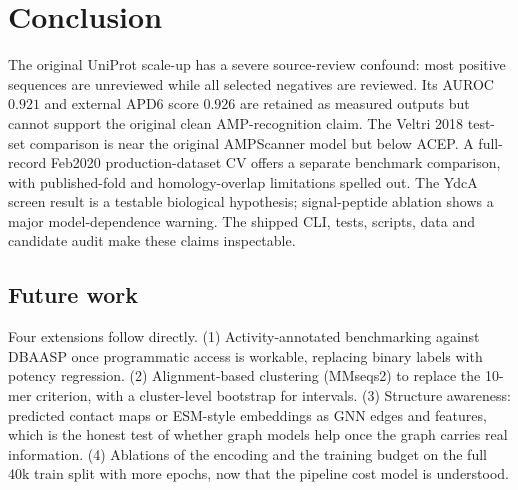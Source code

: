 \section{Conclusion}
The original UniProt scale-up has a severe source-review confound: most
positive sequences are unreviewed while all selected negatives are reviewed.
Its AUROC $0.921$ and external APD6 score $0.926$ are retained as measured
outputs but cannot support the original clean AMP-recognition claim. The
Veltri 2018 test-set comparison is near the original AMPScanner model but
below ACEP. A full-record Feb2020 production-dataset CV offers a separate
benchmark comparison, with published-fold and homology-overlap limitations
spelled out. The YdcA screen result is a testable biological hypothesis;
signal-peptide ablation shows a major model-dependence warning. The shipped
CLI, tests, scripts, data and candidate audit make these claims inspectable.

\subsection{Future work}
Four extensions follow directly. (1) Activity-annotated benchmarking against
DBAASP once programmatic access is workable, replacing binary labels with
potency regression. (2) Alignment-based clustering (MMseqs2) to replace the
10-mer criterion, with a cluster-level bootstrap for intervals. (3) Structure
awareness: predicted contact maps or ESM-style embeddings as GNN edges and
features, which is the honest test of whether graph models help once the
graph carries real information. (4) Ablations of the encoding and the
training budget on the full 40k train split with more epochs, now that the
pipeline cost model is understood.
